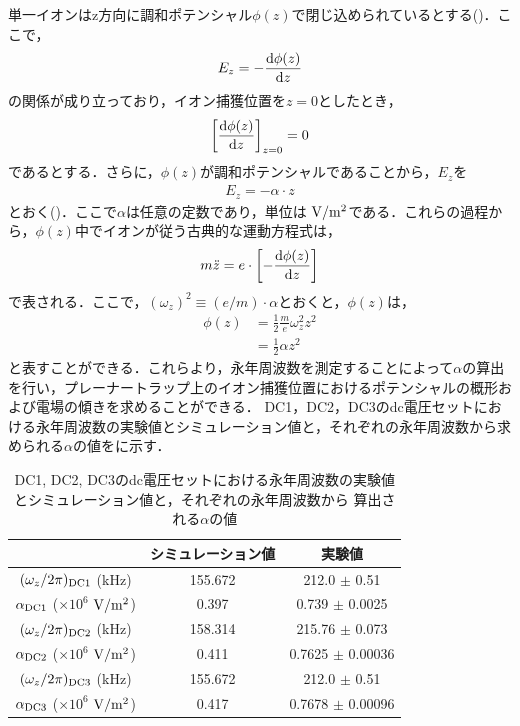 単一イオンはz方向に調和ポテンシャル$\phi (z)$で閉じ込められているとする()．ここで，
\begin{align}
	E_z = - \frac{{\rm d} \phi (z)}{{\rm d} z}
\end{align}
の関係が成り立っており，イオン捕獲位置を$z=0$としたとき，
\begin{align}
\left[\frac{{\rm d} \phi (z)}{{\rm d} z}\right]_{z = 0} = 0
\end{align}
であるとする．さらに，$\phi (z)$が調和ポテンシャルであることから，$E_z$を
\begin{align}
	E_z = - \alpha \cdot z
\end{align}
とおく()．ここで$\alpha$は任意の定数であり，単位は ${\rm  V/m^2}$である．これらの過程から，$\phi (z)$中でイオンが従う古典的な運動方程式は，
\begin{align}
	m \ddot{z} = e \cdot \left[-\frac{{\rm d} \phi (z)}{{\rm d} z}\right]
\end{align}
で表される．ここで，$(\omega_z)^2 \equiv (e/m)\cdot \alpha$とおくと，$\phi (z)$は，
\begin{align}
	\phi (z) &= \frac{1}{2}\frac{m}{e}\omega_z^2 z^2 \\
		&= \frac{1}{2}\alpha z^2
\end{align}
と表すことができる．これらより，永年周波数を測定することによって$\alpha$の算出を行い，プレーナートラップ上のイオン捕獲位置におけるポテンシャルの概形および電場の傾きを求めることができる．
%
\clearpage
%
DC1，DC2，DC3のdc電圧セットにおける永年周波数の実験値とシミュレーション値と，それぞれの永年周波数から求められる$\alpha$の値をに示す．

\begin{table}[h]
	\begin{center}
		\caption{DC1, DC2, DC3のdc電圧セットにおける永年周波数の実験値とシミュレーション値と，それぞれの永年周波数から
		算出される$\alpha$の値}
		\label{tab:alpha_list}
		\begin{tabular}{c|c|c} \hline \hline
			&シミュレーション値&実験値 \\ \hline
			$(\omega_z/2\pi)_{\rm DC1}$ (kHz)&155.672&212.0 $\pm$ 0.51 \\ 
			$\alpha_{\rm DC1}$ ($\times 10^{6}$ ${\rm V/m^2}$)&0.397&0.739 $\pm$ 0.0025 \\ \hline
			$(\omega_z/2\pi)_{\rm DC2}$ (kHz)&158.314&215.76 $\pm$ 0.073 \\ 
			$\alpha_{\rm DC2}$ ($\times 10^{6}$ ${\rm V/m^2}$)&0.411&0.7625 $\pm$ 0.00036 \\ \hline
			$(\omega_z/2\pi)_{\rm DC3}$ (kHz)&155.672&212.0 $\pm$ 0.51 \\ 
			$\alpha_{\rm DC3}$ ($\times 10^{6}$ ${\rm V/m^2}$)&0.417&0.7678 $\pm$ 0.00096 \\ \hline
		\end{tabular}
	\end{center}
\end{table}

